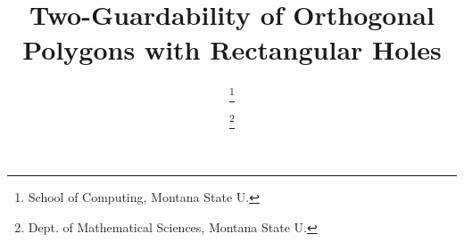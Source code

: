 \documentclass[11pt]{article}
\title{\vspace{-5ex}Two-Guardability of Orthogonal Polygons with Rectangular Holes}
\date{\vspace{-5ex}}
\author{\todo{Authors} \thanks{School of Computing, Montana State U.
} \and \todo{} \thanks{Dept. of Mathematical
    Sciences, Montana State U.     \newline {\scriptsize {\todo{emails}} }} \and
    \todo{author}\footnotemark[2] }
\begin{document}
\thispagestyle{empty}
\maketitle

\begin{abstract}

\end{abstract}




\small{


}
\end{document}
